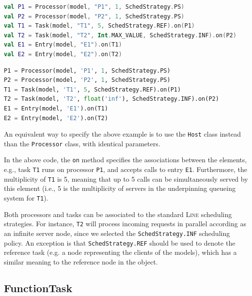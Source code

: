 \begin{KOTLIN}
\begin{lstlisting}[language = kotlin, basicstyle=\ttfamily\scriptsize]
val P1 = Processor(model, "P1", 1, SchedStrategy.PS)
val P2 = Processor(model, "P2", 1, SchedStrategy.PS)
val T1 = Task(model, "T1", 5, SchedStrategy.REF).on(P1)
val T2 = Task(model, "T2", Int.MAX_VALUE, SchedStrategy.INF).on(P2)
val E1 = Entry(model, "E1").on(T1)
val E2 = Entry(model, "E2").on(T2)
\end{lstlisting}
\end{KOTLIN}
\begin{PYTHON}
\begin{lstlisting}[language=python]
P1 = Processor(model, 'P1', 1, SchedStrategy.PS)
P2 = Processor(model, 'P2', 1, SchedStrategy.PS)
T1 = Task(model, 'T1', 5, SchedStrategy.REF).on(P1)
T2 = Task(model, 'T2', float('inf'), SchedStrategy.INF).on(P2)
E1 = Entry(model, 'E1').on(T1)
E2 = Entry(model, 'E2').on(T2)
\end{lstlisting}
\end{PYTHON}
An equivalent way to specify the above example is to use the \texttt{Host} class instead than the \texttt{Processor} class, with identical parameters.

In the above code, the \texttt{on} method specifies the associations between the elements, e.g., task \texttt{T1} runs on processor \texttt{P1}, and accepts calls to entry \texttt{E1}. Furthermore, the multiplicity of \texttt{T1} is 5, meaning that up to 5 calls can be simultaneously served by this element (i.e., 5 is the multiplicity of servers in the underpinning queueing system for \texttt{T1}).

Both processors and tasks can be associated to the standard \textsc{Line} scheduling strategies. For instance, \texttt{T2} will process incoming requests in parallel according as an infinite server node, since we selected the \texttt{SchedStrategy.INF} scheduling policy. An exception is that \texttt{SchedStrategy.REF} should be used to denote the reference task (e.g. a node representing the clients of the models), which has a similar meaning to the reference node in the  object.

\subsection{FunctionTask}

